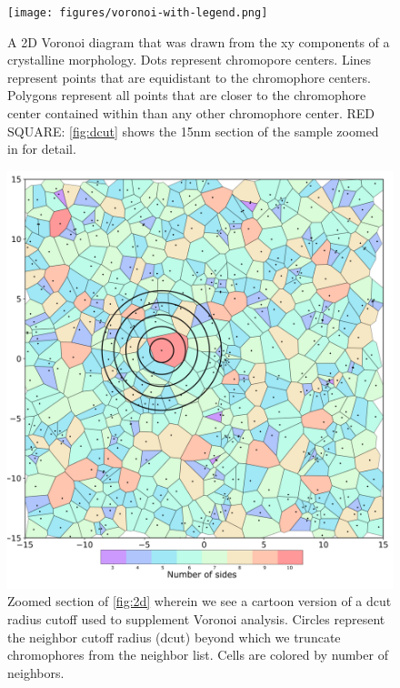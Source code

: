 \begin{figure}
  \center
  \texttt{[image: figures/voronoi-with-legend.png]} 
  \caption{A 2D Voronoi diagram that was drawn from the xy components of a crystalline  morphology. Dots
    represent chromopore centers. Lines represent points that are equidistant to the chromophore centers.
    Polygons represent all points that are closer to the chromophore center contained within than any other
    chromophore center. RED SQUARE: \autoref{fig:dcut} shows the 15nm section of the sample zoomed in for
    detail.}
  \label{fig:2d}
\end{figure}
\begin{figure}
  \center
  \includegraphics[width=\linewidth]{figures/voronoi-dcut-with-legend.png} 
    \caption{Zoomed section of \autoref{fig:2d} wherein we see a cartoon version of a dcut radius cutoff
    used to supplement Voronoi analysis. Circles represent the neighbor cutoff
    radius (dcut) beyond which we truncate chromophores from the neighbor list.
    Cells are colored by number of neighbors.}
  \label{fig:dcut}
\end{figure}

